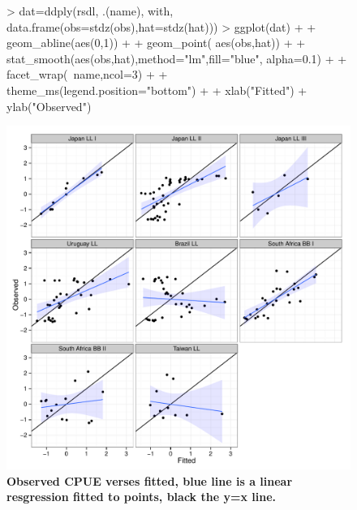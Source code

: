 \documentclass[shortnames,nojss,article]{jss}
\begin{document}
\begin{figure}\begin{center}
\begin{Schunk}
\begin{Sinput}
> dat=ddply(rsdl, .(name), with, data.frame(obs=stdz(obs),hat=stdz(hat)))
> ggplot(dat) +
+           geom_abline(aes(0,1))                         +
+           geom_point( aes(obs,hat))                     +
+           stat_smooth(aes(obs,hat),method="lm",fill="blue", alpha=0.1)       +
+           facet_wrap(~name,ncol=3)                      +
+           theme_ms(legend.position="bottom")            +
+           xlab("Fitted") + ylab("Observed")
\end{Sinput}
\end{Schunk}
\includegraphics{diags-018}
\caption{\bf{Observed CPUE verses fitted, blue line is a linear resgression fitted to points, black the y=x line.}}
\label{residual:1}
\end{center}
\end{figure}
\end{document}
